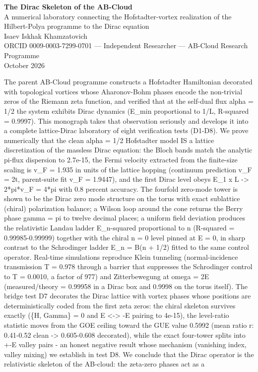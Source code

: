 \documentclass[11pt,a4paper]{article}
\begin{document}
\begin{center}
{\huge\bfseries\color{labblue} The Dirac Skeleton of the AB-Cloud}\\[0.8em]
{\large A numerical laboratory connecting the Hofstadter-vortex realization of the Hilbert-Polya programme to the Dirac equation}\\[1.2em]
{\normalsize Isaev Iskhak Khamzatovich}\\[0.3em]
{\small ORCID 0009-0003-7299-0701 --- Independent Researcher --- AB-Cloud Research Programme}\\[0.3em]
{\small October 2026}
\end{center}
\begin{tcolorbox}[breakable, colback=labblue!6, colframe=labblue!70!black, boxrule=0.6pt, title={Abstract / Аннотация}]
The parent AB-Cloud programme constructs a Hofstadter Hamiltonian decorated with topological vortices whose Aharonov-Bohm phases encode the non-trivial zeros of the Riemann zeta function, and verified that at the self-dual flux alpha = 1/2 the system exhibits Dirac dynamics (E\_\allowbreak{}min proportional to 1/L, R-squared = 0.9997). This monograph takes that observation seriously and develops it into a complete lattice-Dirac laboratory of eight verification tests (D1-D8). We prove numerically that the clean alpha = 1/2 Hofstadter model IS a lattice discretization of the massless Dirac equation: the Bloch bands match the analytic pi-flux dispersion to 2.7e-15, the Fermi velocity extracted from the finite-size scaling is v\_\allowbreak{}F = 1.935 in units of the lattice hopping (continuum prediction v\_\allowbreak{}F = 2t, parent-suite fit v\_\allowbreak{}F = 1.9447), and the first Dirac level obeys E\_\allowbreak{}1 x L -> 2*pi*v\_\allowbreak{}F = 4*pi with 0.8 percent accuracy. The fourfold zero-mode tower is shown to be the Dirac zero mode structure on the torus with exact sublattice (chiral) polarization balance; a Wilson loop around the cone returns the Berry phase gamma = pi to twelve decimal places; a uniform field deviation produces the relativistic Landau ladder E\_\allowbreak{}n-squared proportional to n (R-squared = 0.99985-0.99999) together with the chiral n = 0 level pinned at E = 0, in sharp contrast to the Schrodinger ladder E\_\allowbreak{}n = B(n + 1/2) fitted to the same control operator. Real-time simulations reproduce Klein tunneling (normal-incidence transmission T = 0.978 through a barrier that suppresses the Schrodinger control to T = 0.0010, a factor of 977) and Zitterbewegung at omega = 2E (measured/theory = 0.99958 in a Dirac box and 0.9998 on the torus itself). The bridge test D7 decorates the Dirac lattice with vortex phases whose positions are deterministically coded from the first zeta zeros: the chiral skeleton survives exactly (\{H, Gamma\} = 0 and E <-> -E pairing to 4e-15), the level-ratio statistic moves from the GOE ceiling toward the GUE value 0.5992 (mean ratio r: 0.41-0.52 clean -> 0.605-0.608 decorated), while the exact four-tower splits into +-E valley pairs - an honest negative result whose mechanism (vanishing index, valley mixing) we establish in test D8. We conclude that the Dirac operator is the relativistic skeleton of the AB-cloud: the zeta-zero phases act as a 
\end{tcolorbox}
\end{document}

